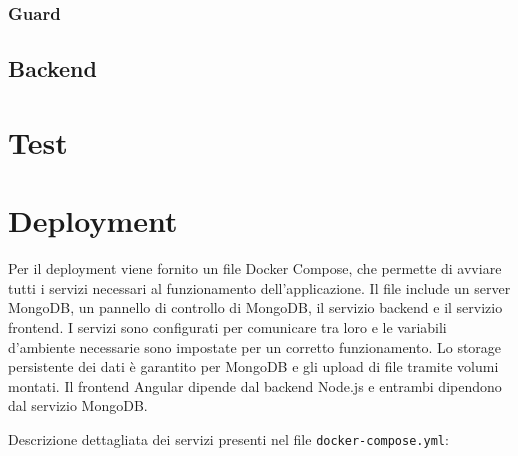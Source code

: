 \documentclass[12pt,a4paper,openright,twoside]{book}
\begin{document}
\subsection*{Guard}

\section{Backend}

\chapter{Test}

\chapter{Deployment}

Per il deployment viene fornito un file Docker Compose, che permette di avviare tutti i servizi necessari al funzionamento dell'applicazione. Il file include un server MongoDB, un pannello di controllo di MongoDB, il servizio backend e il servizio frontend. I servizi sono configurati per comunicare tra loro e le variabili d'ambiente necessarie sono impostate per un corretto funzionamento. Lo storage persistente dei dati è garantito per MongoDB e gli upload di file tramite volumi montati. Il frontend Angular dipende dal backend Node.js e entrambi dipendono dal servizio MongoDB.

Descrizione dettagliata dei servizi presenti nel file \texttt{docker-compose.yml}:
\end{document}

